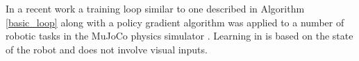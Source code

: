 In a recent work \cite{trpo_ensemble} a training loop similar to one described in  Algorithm \ref{basic_loop} along with a policy gradient algorithm \cite{trpo} was applied to a number of robotic tasks in the MuJoCo physics simulator \cite{mujoco}. Learning in  \cite{trpo_ensemble} is based on the state of the robot and does not involve visual inputs. 


